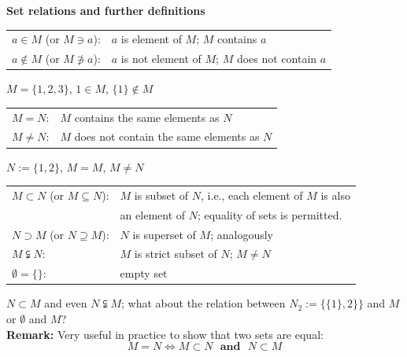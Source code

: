 \begin{frame}
\textbf{\large Set relations and further definitions}\\
\vspace{0.2cm}
\begin{table}[h] \color{defgruen}
	\begin{tabular}[t]{ll}
		$a \in M$ (or $M \ni a$): & $a$ is element of $M$; $M$ contains $a$\\\vspace{0.2cm}
		$a \not\in M$ (or $M \not\ni a$): & $a$ is not element of $M$; $M$ does not contain $a$
	\end{tabular}
\end{table}	 
{\blank
$M = \{1,2,3\}$, $1 \in M$, $\{1\} \notin M$
	\vspace*{0.4cm}
}
\begin{table}[h] \color{defgruen}
	\begin{tabular}[t]{ll}
		$M=N$: & $M$ contains the same elements as $N$\\\vspace{0.2cm}
		$M\not=N$: & $M$ does not contain the same elements as $N$
	\end{tabular}
\end{table}

{\blank
	$N := \{1,2\}$,  $M=M$, $M \neq N$
	\vspace*{0.4cm}
}

\begin{table}[h] \color{defgruen}
	\begin{tabular}[t]{ll}
		$M \subset N$ (or $M\subseteq N$): & $M$ is subset of $N$, i.e., each element of $M$ is also \\\vspace{0.2cm}
		& an element of $N$; equality of sets is permitted.\\\vspace{0.2cm}
		$N \supset M$ (or $N\supseteq M$): & $N$ is superset of $M$; analogously\\\vspace{0.2cm}
		$M \subsetneqq N$: & $M$ is strict subset of $N$; $M\not=N$\\\vspace{0.2cm}
		$\emptyset = \{\}$: & empty set
	\end{tabular}
\end{table}
{\blank
	$N \subset M$ and even $N \subsetneqq M$; what about the relation between $N_2 :=\{\{1\}, 2\}\}$ and  $M$ or $\emptyset$ and  $M$?
\vspace*{0.4cm}
}
~\\
\textbf{Remark:} Very useful in practice to show that two sets are equal: \\
$$M=N \iff M\subset N \textbf{~~and~~} N \subset M $$
\end{frame}

